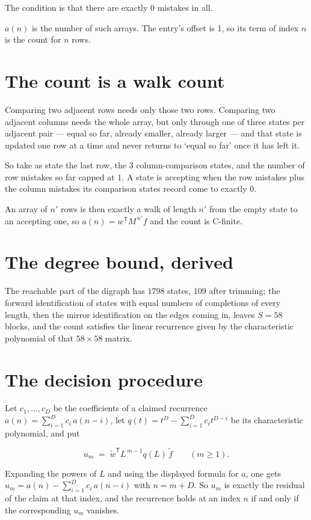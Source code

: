\documentclass[11pt]{article}
\theoremstyle{definition}
\begin{document}
The condition is that there are exactly $0$ mistakes in all.

$a(n)$ is the number of such arrays. The entry's offset is 1, so its term of index $n$ is the count for $n$ rows.

\section{The count is a walk count}

Comparing two adjacent rows needs only those two rows. Comparing two adjacent columns needs the whole array, but only through one of three states per adjacent pair --- equal so far, already smaller, already larger --- and that state is updated one row at a time and never returns to `equal so far' once it has left it.

So take as state the last row, the $3$ column-comparison states, and the number of row mistakes so far capped at $1$. A state is accepting when the row mistakes plus the column mistakes its comparison states record come to exactly $0$.

An array of $n'$ rows is then exactly a walk of length $n'$ from the empty state to an accepting one, so $a(n) = w^{\mathsf T}M^{\,n'}f$ and the count is C-finite.

\section{The degree bound, derived}

The reachable part of the digraph has $1798$ states, $109$ after trimming; the forward identification of states with equal numbers of completions of every length, then the mirror identification on the edges coming in, leaves $S = 58$ blocks, and the count satisfies the linear recurrence given by the characteristic polynomial of that $58\times58$ matrix.

\section{The decision procedure}

Let $c_1,\dots,c_D$ be the coefficients of a claimed recurrence $a(n) = \sum_{i=1}^{D} c_i\,a(n-i)$, let $q(t) = t^{D} - \sum_{i=1}^{D} c_i t^{D-i}$ be its characteristic polynomial, and put

\[u_m \;=\; \tilde w^{\mathsf T} L^{\,m-1} q(L)\,\tilde f \qquad (m \ge 1).\]

Expanding the powers of $L$ and using the displayed formula for $a$, one gets $u_m = a(n) - \sum_{i=1}^{D} c_i\,a(n-i)$ with $n = m + D$. So $u_m$ is exactly the residual of the claim at that index, and the recurrence holds at an index $n$ if and only if the corresponding $u_m$ vanishes.
\end{document}
